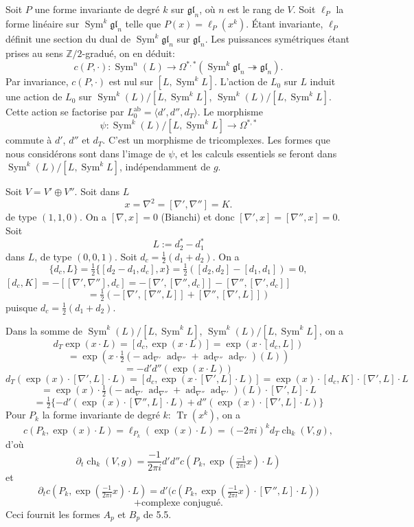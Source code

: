 \documentclass[12pt,a4paper]{article}
\theoremstyle{plain}
\theoremstyle{definition}
\DeclareMathOperator{\Tr}{Tr}
\DeclareMathOperator{\ch}{ch}
\DeclareMathOperator{\Sym}{Sym}
\DeclareMathOperator{\ad}{ad}
\newcommand{\ZZ}{\mathbb{Z}}
\begin{document}
\subsection{}

Soit $P$ une forme invariante de degr\'e $k$ sur $\mathfrak{gl}_n$, o\`u $n$ est le rang de
$V$. Soit $\ell_P$ la forme lin\'eaire sur $\Sym^k \mathfrak{gl}_n$ telle que $P(x) = \ell_P(x^k)$. \'Etant
invariante, $\ell_P$ d\'efinit une section du dual de $\Sym^k \mathfrak{gl}_n$ sur $\mathfrak{gl}_n$. Les puissances
sym\'etriques \'etant prises au sens $\ZZ/2$-gradu\'e, on en d\'eduit:
\[
c(P, \cdot): \Sym^n(L) \longrightarrow \Omega^{*,*}(\Sym^k \mathfrak{gl}_n \twoheadrightarrow \mathfrak{gl}_n) .
\]
Par invariance, $c(P, \cdot)$ est nul sur $[L, \Sym^k L]$. L'action de $L_0$ sur $L$
induit une action de $L_0$ sur $\Sym^k(L)/[L, \Sym^k L]$, $\Sym^k(L)/[L, \Sym^k L]$. Cette action se factorise
par $L_0^{\text{ab}} = \langle d', d'', d_T \rangle$. Le morphisme
\[
\psi: \Sym^k(L)/[L, \Sym^k L] \to \Omega^{*,*}
\]
commute \`a $d'$, $d''$ et $d_T$. C'est un morphisme de tricomplexes. Les formes que
nous consid\'erons sont dans l'image de $\psi$, et les calculs essentiels se feront
dans $\Sym^k(L)/[L, \Sym^k L]$, ind\'ependamment de $g$.

Soit $V = V' \oplus V''$. Soit dans $L$
\[
x = \nabla^2 = [\nabla', \nabla''] = K .
\]
de type $(1,1,0)$. On a $[\nabla, x] = 0$ ($\text{Bianchi}$) et donc $[\nabla', x] = [\nabla'', x] = 0$.
Soit
\[
L := d_2^* - d_1^*
\]
dans $L$, de type $(0,0,1)$. Soit $d_c = \frac{1}{2}(d_1 + d_2)$. On a
\[
\{d_c, L\} = \tfrac{1}{2}\{[d_2 - d_1, d_c], x\} = \tfrac{1}{2}([d_2, d_2] - [d_1, d_1]) = 0,
\]
$[d_c, K] = -[[\nabla', \nabla''], d_c] = -[\nabla', [\nabla'', d_c]] - [\nabla'', [\nabla', d_c]]$
\[
= \tfrac{1}{2}(-[\nabla', [\nabla'', L]] + [\nabla'', [\nabla', L]])
\]
puisque $d_c = \frac{1}{2}(d_1 + d_2)$.

Dans la somme de $\Sym^k(L)/[L, \Sym^k L]$, $\Sym^k(L)/[L, \Sym^k L]$, on a
\[
d_T \exp(x \cdot L) = [d_c, \exp(x \cdot L)] = \exp(x \cdot [d_c, L])
\]
\[
= \exp(x \cdot \tfrac{1}{2}(-\ad_{\nabla'} \ad_{\nabla''} + \ad_{\nabla''} \ad_{\nabla'})(L))
\]
\[
= -d'd''(\exp(x \cdot L))
\]
\[
d_T(\exp(x) \cdot [\nabla', L] \cdot L) = [d_c, \exp(x \cdot [\nabla', L] \cdot L)] = \exp(x) \cdot [d_c, K] \cdot [\nabla', L] \cdot L
\]
\[
= \exp(x) \cdot \tfrac{1}{2}(-\ad_{\nabla'} \ad_{\nabla''} + \ad_{\nabla''} \ad_{\nabla'})(L) \cdot [\nabla', L] \cdot L
\]
\[
= \tfrac{1}{2}\{-d'(\exp(x) \cdot [\nabla'', L] \cdot L) + d''(\exp(x) \cdot [\nabla', L] \cdot L)\}
\]
Pour $P_k$ la forme invariante de degr\'e $k$: $\Tr(x^k)$, on a
\[
c(P_k, \exp(x) \cdot L) = \ell_{P_k}(\exp(x) \cdot L) = (-2\pi i)^k d_T \ch_k(V, g) ,
\]
d'o\`u
\[
\partial_t \ch_k(V, g) = \frac{-1}{2\pi i} d'd'' c(P_k, \exp(\tfrac{-1}{2\pi i} x) \cdot L)
\]
et
\[
\partial_t c(P_k, \exp(\tfrac{-1}{2\pi i} x) \cdot L) = d'\bigl(c(P_k, \exp(\tfrac{-1}{2\pi i} x) \cdot [\nabla'', L] \cdot L)\bigr)
\]
\[
+ \text{complexe conjugu\'e.}
\]
Ceci fournit les formes $A_p$ et $B_p$ de 5.5.
\end{document}
